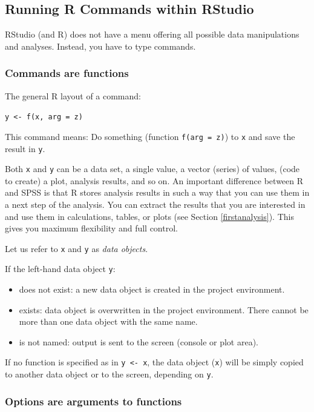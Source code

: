 \documentclass[doc,floatsintext]{apa6}
\providecommand{\tightlist}{%
  \setlength{\itemsep}{0pt}\setlength{\parskip}{0pt}}
\begin{document}
\subsection{Running R Commands within RStudio}\label{rcommands}

RStudio (and R) does not have a menu offering all possible data
manipulations and analyses. Instead, you have to type commands.

\subsubsection{Commands are functions}\label{commands-are-functions}

The general R layout of a command:

\texttt{y\ \textless{}-\ f(x,\ arg\ =\ z)}

This command means: Do something (function \texttt{f(arg\ =\ z)}) to
\texttt{x} and save the result in \texttt{y}.

Both \texttt{x} and \texttt{y} can be a data set, a single value, a
vector (series) of values, (code to create) a plot, analysis results,
and so on. An important difference between R and SPSS is that R stores
analysis results in such a way that you can use them in a next step of
the analysis. You can extract the results that you are interested in and
use them in calculations, tables, or plots (see Section
\ref{firstanalysis}). This gives you maximum flexibility and full
control.

Let us refer to \texttt{x} and \texttt{y} as \emph{data objects}.

If the left-hand data object \texttt{y}:

\begin{itemize}
\tightlist
\item
  does not exist: a new data object is created in the project
  environment.
\item
  exists: data object is overwritten in the project environment. There
  cannot be more than one data object with the same name.
\item
  is not named: output is sent to the screen (console or plot area).
\end{itemize}

If no function is specified as in \texttt{y\ \textless{}-\ x}, the data
object (\texttt{x}) will be simply copied to another data object or to
the screen, depending on \texttt{y}.

\subsubsection{Options are arguments to
functions}\label{options-are-arguments-to-functions}
\end{document}
